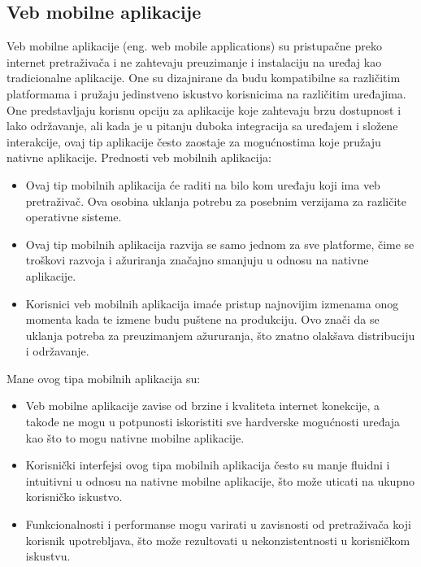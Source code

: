 \documentclass[12pt,oneside]{memoir}
\begin{document}
\subsection{Veb mobilne aplikacije}
Veb mobilne aplikacije (eng. web mobile applications) su pristupačne preko internet pretraživača i ne zahtevaju preuzimanje i instalaciju na uređaj kao tradicionalne aplikacije. One su dizajnirane da budu kompatibilne sa različitim platformama i pružaju jedinstveno iskustvo korisnicima na različitim uređajima. One predstavljaju korisnu opciju za aplikacije koje zahtevaju brzu dostupnost i lako održavanje, ali kada je u pitanju duboka integracija sa uređajem i složene interakcije, ovaj tip aplikacije često zaostaje za mogućnostima koje pružaju nativne aplikacije. Prednosti veb mobilnih aplikacija:

\begin{itemize}
    \item Ovaj tip mobilnih aplikacija će raditi na bilo kom uređaju koji ima veb pretraživač. Ova osobina uklanja potrebu za posebnim verzijama za različite operativne sisteme.
    \item Ovaj tip mobilnih aplikacija razvija se samo jednom za sve platforme, čime se troškovi razvoja i ažuriranja značajno smanjuju u odnosu na nativne aplikacije.
    \item Korisnici veb mobilnih aplikacija imaće pristup najnovijim izmenama onog momenta kada te izmene budu puštene na produkciju. Ovo znači da se uklanja potreba za preuzimanjem ažururanja, što znatno olakšava distribuciju i održavanje.
\end{itemize}
Mane ovog tipa mobilnih aplikacija su:
\begin{itemize}
    \item Veb mobilne aplikacije zavise od brzine i kvaliteta internet konekcije, a takođe ne mogu u potpunosti iskoristiti sve hardverske mogućnosti uređaja kao što to mogu nativne mobilne aplikacije.
    \item Korisnički interfejsi ovog tipa mobilnih aplikacija često su manje fluidni i intuitivni u odnosu na nativne mobilne aplikacije, što može uticati na ukupno korisničko iskustvo.
    \item Funkcionalnosti i performanse mogu varirati u zavisnosti od pretraživača koji korisnik upotrebljava, što može rezultovati u nekonzistentnosti u korisničkom iskustvu.
\end{itemize}
\end{document}
